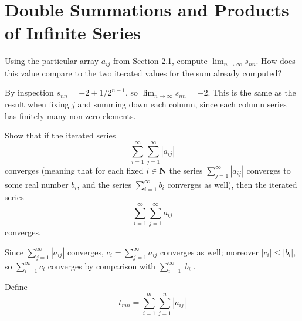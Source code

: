 \section{Double Summations and Products of Infinite Series}

\begin{exercise}
    Using the particular array \(a_{ij}\) from Section 2.1, compute \(\lim_{n \to \infty} s_{nn}\). How does this value compare to the two iterated values for the
sum already computed?
\end{exercise}

\begin{solution}
By inspection \(s_{nn} = -2 + 1/2^{n - 1}\), so \(\lim_{n \to \infty} s_{nn} = -2\). This is the same as the result when fixing \(j\) and summing down each column, since each column series has finitely many non-zero elements.
\end{solution}

\begin{exercise}
    Show that if the iterated series
    \[ \sum^\infty_{i = 1} \sum^\infty_{j=1} \left| a_{ij} \right| \]
    converges (meaning that for each fixed \(i \in \mathbf{N}\) the series \(\sum^\infty_{j=1}|a_{ij}|\) converges to some real number \(b_i\), and the series \(\sum^\infty_{i=1}b_i\) converges as well), then the iterated series
    \[\sum^\infty_{i=1} \sum^\infty_{j=1} a_{ij}\]
    converges.
\end{exercise}

\begin{solution}
    Since \(\sum^\infty_{j=1}|a_{ij}|\) converges, \(c_i = \sum^\infty_{j=1}a_{ij}\) converges as well; moreover \(|c_i| \leq |b_i|\), so \(\sum^\infty_{i=1}c_i\) converges by comparison with \(\sum^\infty_{i=1}|b_i|\).
\end{solution}

\begin{exercise}
Define
\[
    t_{mn}=  \sum^m_{i=1}\sum^n_{j=1}|a_{ij}|
\]
\end{exercise}

